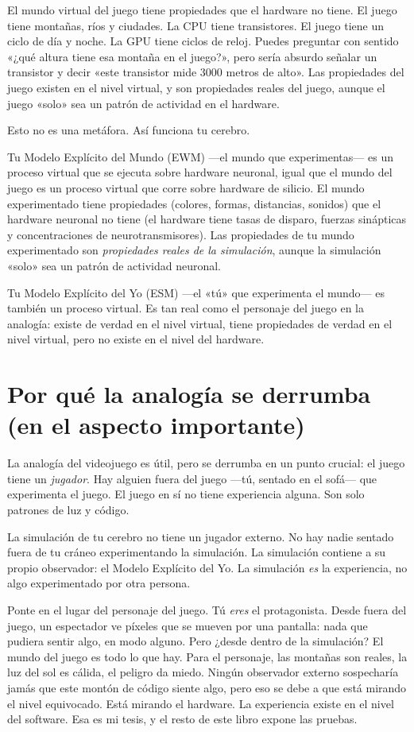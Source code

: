 \documentclass[11pt, twoside, openright]{book}
\begin{document}
El mundo virtual del juego tiene propiedades que el hardware no tiene. El juego tiene montañas, ríos y ciudades. La CPU tiene transistores. El juego tiene un ciclo de día y noche. La GPU tiene ciclos de reloj. Puedes preguntar con sentido «¿qué altura tiene esa montaña en el juego?», pero sería absurdo señalar un transistor y decir «este transistor mide 3000 metros de alto». Las propiedades del juego existen en el nivel virtual, y son propiedades reales del juego, aunque el juego «solo» sea un patrón de actividad en el hardware.

Esto no es una metáfora. Así funciona tu cerebro.

Tu Modelo Explícito del Mundo (EWM) ---el mundo que experimentas--- es un proceso virtual que se ejecuta sobre hardware neuronal, igual que el mundo del juego es un proceso virtual que corre sobre hardware de silicio. El mundo experimentado tiene propiedades (colores, formas, distancias, sonidos) que el hardware neuronal no tiene (el hardware tiene tasas de disparo, fuerzas sinápticas y concentraciones de neurotransmisores). Las propiedades de tu mundo experimentado son \textit{propiedades reales de la simulación}, aunque la simulación «solo» sea un patrón de actividad neuronal.

Tu Modelo Explícito del Yo (ESM) ---el «tú» que experimenta el mundo--- es también un proceso virtual. Es tan real como el personaje del juego en la analogía: existe de verdad en el nivel virtual, tiene propiedades de verdad en el nivel virtual, pero no existe en el nivel del hardware.

\section*{Por qué la analogía se derrumba (en el aspecto importante)}

La analogía del videojuego es útil, pero se derrumba en un punto crucial: el juego tiene un \textit{jugador}. Hay alguien fuera del juego ---tú, sentado en el sofá--- que experimenta el juego. El juego en sí no tiene experiencia alguna. Son solo patrones de luz y código.

La simulación de tu cerebro no tiene un jugador externo. No hay nadie sentado fuera de tu cráneo experimentando la simulación. La simulación contiene a su propio observador: el Modelo Explícito del Yo. La simulación \textit{es} la experiencia, no algo experimentado por otra persona.

Ponte en el lugar del personaje del juego. Tú \textit{eres} el protagonista. Desde fuera del juego, un espectador ve píxeles que se mueven por una pantalla: nada que pudiera sentir algo, en modo alguno. Pero ¿desde dentro de la simulación? El mundo del juego es todo lo que hay. Para el personaje, las montañas son reales, la luz del sol es cálida, el peligro da miedo. Ningún observador externo sospecharía jamás que este montón de código siente algo, pero eso se debe a que está mirando el nivel equivocado. Está mirando el hardware. La experiencia existe en el nivel del software. Esa es mi tesis, y el resto de este libro expone las pruebas.
\end{document}
